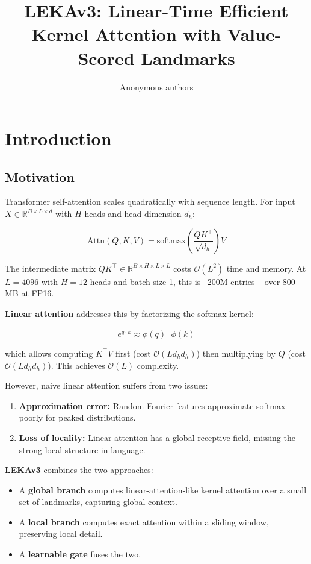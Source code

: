 \title{\textbf{LEKAv3: Linear-Time Efficient Kernel Attention with Value-Scored Landmarks}}

\author{Anonymous authors}


\section{Introduction}

\subsection{Motivation}

Transformer self-attention scales quadratically with sequence length. For 
input $X \in \mathbb{R}^{B \times L \times d}$ with $H$ heads and head 
dimension $d_h$:

\[
\text{Attn}(Q, K, V) = \text{softmax}\!\left(\frac{Q K^\top}{\sqrt{d_h}}\right) V
\tag{1.1}
\]

The intermediate matrix $QK^\top \in \mathbb{R}^{B \times H \times L \times L}$ 
costs $\mathcal{O}(L^2)$ time and memory. At $L = 4096$ with $H = 12$ heads 
and batch size 1, this is ~200M entries -- over 800 MB at FP16.

\textbf{Linear attention} addresses this by factorizing the softmax kernel:

\[
e^{q \cdot k} \approx \phi(q)^\top \phi(k)
\tag{1.2}
\]

which allows computing $K^\top V$ first (cost $\mathcal{O}(L d_h d_h)$) then 
multiplying by $Q$ (cost $\mathcal{O}(L d_h d_h)$). This achieves $\mathcal{O}(L)$ 
complexity.

However, naive linear attention suffers from two issues:

\begin{enumerate}
\item \textbf{Approximation error:} Random Fourier features approximate softmax poorly
  for peaked distributions.
\item \textbf{Loss of locality:} Linear attention has a global receptive field, missing
  the strong local structure in language.

\end{enumerate}
\textbf{LEKAv3} combines the two approaches:

\begin{itemize}
\item A \textbf{global branch} computes linear-attention-like kernel attention over
  a small set of landmarks, capturing global context.
\item A \textbf{local branch} computes exact attention within a sliding window,
  preserving local detail.
\item A \textbf{learnable gate} fuses the two.

\end{itemize}
